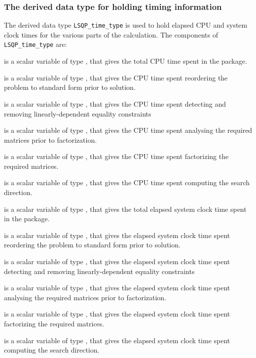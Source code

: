 \documentclass{galahad}
\newcommand{\packagename}{LSQP}
\begin{document}

\subsubsection{The derived data type for holding timing 
 information}\label{typetime}
The derived data type 
{\tt \packagename\_time\_type} 
is used to hold elapsed CPU and system clock times for the various parts of 
the calculation. The components of 
{\tt \packagename\_time\_type} 
are:
\begin{description}
 is a scalar variable of type \realdp, that gives
 the total CPU time spent in the package.

 is a scalar variable of type \realdp, that gives
 the CPU time spent reordering the problem to standard form prior to solution.

 is a scalar variable of type \realdp, that gives
 the CPU time spent detecting and removing linearly-dependent equality 
constraints

 is a scalar variable of type \realdp, that gives
 the CPU time spent analysing the required matrices prior to factorization.

 is a scalar variable of type \realdp, that gives
 the CPU time spent factorizing the required matrices.

 is a scalar variable of type \realdp, that gives
 the CPU time spent computing the search direction.

 is a scalar variable of type \realdp, that gives
 the total elapsed system clock time spent in the package.

 is a scalar variable of type \realdp, that gives
 the elapsed system clock time spent reordering the problem to standard form 
prior to solution.

 is a scalar variable of type \realdp, that 
gives  the elapsed system clock time spent detecting and removing 
linearly-dependent equality 
 constraints

 is a scalar variable of type \realdp, that gives
 the elapsed system clock time spent analysing the required matrices prior to 
factorization.

 is a scalar variable of type \realdp, that gives
 the elapsed system clock time spent factorizing the required matrices.

 is a scalar variable of type \realdp, that gives
 the elapsed system clock time spent computing the search direction.

\end{description}
\end{document}
